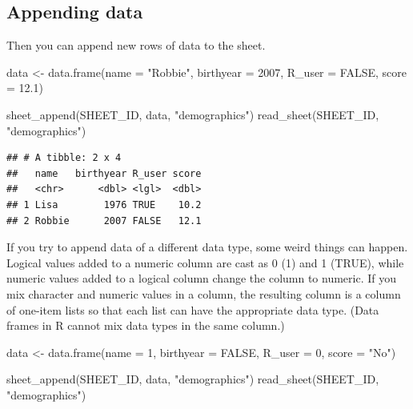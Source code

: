 \documentclass[
  oneside]{book}
\newenvironment{Shaded}{\begin{snugshade}}{\end{snugshade}}
\newcommand{\AttributeTok}[1]{\textcolor[rgb]{0.77,0.63,0.00}{#1}}
\newcommand{\ConstantTok}[1]{\textcolor[rgb]{0.00,0.00,0.00}{#1}}
\newcommand{\DecValTok}[1]{\textcolor[rgb]{0.00,0.00,0.81}{#1}}
\newcommand{\FloatTok}[1]{\textcolor[rgb]{0.00,0.00,0.81}{#1}}
\newcommand{\FunctionTok}[1]{\textcolor[rgb]{0.00,0.00,0.00}{#1}}
\newcommand{\NormalTok}[1]{#1}
\newcommand{\OtherTok}[1]{\textcolor[rgb]{0.56,0.35,0.01}{#1}}
\newcommand{\StringTok}[1]{\textcolor[rgb]{0.31,0.60,0.02}{#1}}
\begin{document}
\hypertarget{appending-data}{%
\subsection{Appending data}\label{appending-data}}

Then you can append new rows of data to the sheet.

\begin{Shaded}
\begin{Highlighting}[]
\NormalTok{data }\OtherTok{\textless{}{-}} \FunctionTok{data.frame}\NormalTok{(}\AttributeTok{name =} \StringTok{"Robbie"}\NormalTok{, }\AttributeTok{birthyear =} \DecValTok{2007}\NormalTok{, }\AttributeTok{R\_user =} \ConstantTok{FALSE}\NormalTok{, }\AttributeTok{score =} \FloatTok{12.1}\NormalTok{)}

\FunctionTok{sheet\_append}\NormalTok{(SHEET\_ID, data, }\StringTok{"demographics"}\NormalTok{)}
\FunctionTok{read\_sheet}\NormalTok{(SHEET\_ID, }\StringTok{"demographics"}\NormalTok{)}
\end{Highlighting}
\end{Shaded}

\begin{verbatim}
## # A tibble: 2 x 4
##   name   birthyear R_user score
##   <chr>      <dbl> <lgl>  <dbl>
## 1 Lisa        1976 TRUE    10.2
## 2 Robbie      2007 FALSE   12.1
\end{verbatim}

If you try to append data of a different data type, some weird things can happen. Logical values added to a numeric column are cast as \DecValTok{0} (\DecValTok{1}) and \DecValTok{1} (\ConstantTok{TRUE}), while numeric values added to a logical column change the column to numeric. If you mix character and numeric values in a column, the resulting column is a column of one-item lists so that each list can have the appropriate data type. (Data frames in R cannot mix data types in the same column.)

\begin{Shaded}
\begin{Highlighting}[]
\NormalTok{data }\OtherTok{\textless{}{-}} \FunctionTok{data.frame}\NormalTok{(}\AttributeTok{name =} \DecValTok{1}\NormalTok{, }\AttributeTok{birthyear =} \ConstantTok{FALSE}\NormalTok{, }\AttributeTok{R\_user =} \DecValTok{0}\NormalTok{, }\AttributeTok{score =} \StringTok{"No"}\NormalTok{)}

\FunctionTok{sheet\_append}\NormalTok{(SHEET\_ID, data, }\StringTok{"demographics"}\NormalTok{)}
\FunctionTok{read\_sheet}\NormalTok{(SHEET\_ID, }\StringTok{"demographics"}\NormalTok{)}
\end{Highlighting}
\end{Shaded}
\end{document}

